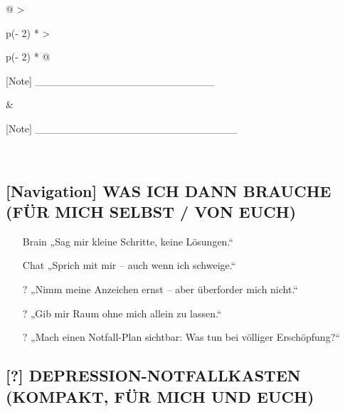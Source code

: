 \begin{longtable}[]{@{}
  >{\raggedright\arraybackslash}p{(\columnwidth - 2\tabcolsep) * }
  >{\raggedright\arraybackslash}p{(\columnwidth - 2\tabcolsep) * }@{}}
\toprule\noalign{}
\begin{minipage}[b]{\linewidth}\raggedright
[Note] \_\_\_\_\_\_\_\_\_\_\_\_\_\_\_\_\_\_\_\_\_\_\_\_
\end{minipage} & \begin{minipage}[b]{\linewidth}\raggedright
[Note] \_\_\_\_\_\_\_\_\_\_\_\_\_\_\_\_\_\_\_\_\_\_\_\_\_\_\_
\end{minipage} \
\midrule\noalign{}
\endhead
\bottomrule\noalign{}
\endlastfoot
\end{longtable}

\hypertarget{was-ich-dann-brauche-fuxfcr-mich-selbst-von-euch}{%
\subsection{[Navigation] WAS ICH DANN BRAUCHE (FÜR MICH SELBST / VON EUCH)}\label{was-ich-dann-brauche-fuxfcr-mich-selbst-von-euch}}

\begin{itemize}
\tightlist
\item
  [Brain] „Sag mir kleine Schritte, keine Lösungen.``
\end{itemize}

\begin{itemize}
\tightlist
\item
  [Chat] „Sprich mit mir -- auch wenn ich schweige.``
\end{itemize}

\begin{itemize}
\tightlist
\item
  [?] „Nimm meine Anzeichen ernst -- aber überforder mich nicht.``
\end{itemize}

\begin{itemize}
\tightlist
\item
  [?] „Gib mir Raum ohne mich allein zu lassen.``
\end{itemize}

\begin{itemize}
\tightlist
\item
  [?] „Mach einen Notfall-Plan sichtbar: Was tun bei völliger Erschöpfung?{}``
\end{itemize}

\hypertarget{depression-notfallkasten-kompakt-fuxfcr-mich-und-euch}{%
\subsection{[?] DEPRESSION-NOTFALLKASTEN (KOMPAKT, FÜR MICH UND EUCH)}\label{depression-notfallkasten-kompakt-fuxfcr-mich-und-euch}}

